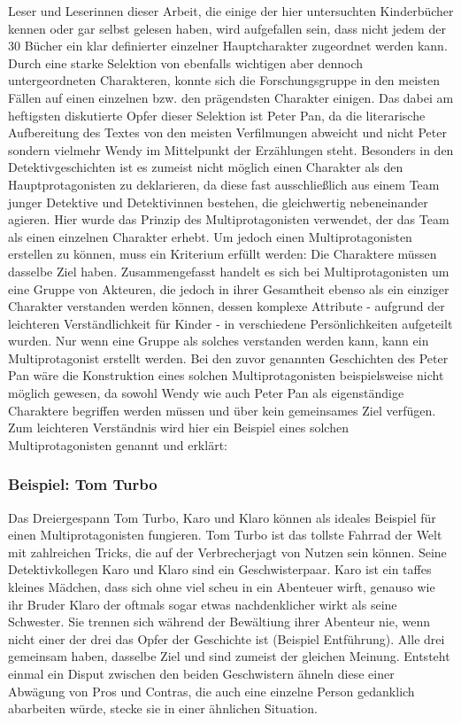 Leser und Leserinnen dieser Arbeit, die einige der hier untersuchten
Kinderbücher kennen oder gar selbst gelesen haben, wird aufgefallen
sein, dass nicht jedem der 30 Bücher ein klar definierter einzelner
Hauptcharakter zugeordnet werden kann. Durch eine starke Selektion von
ebenfalls wichtigen aber dennoch untergeordneten Charakteren, konnte
sich die Forschungsgruppe in den meisten Fällen auf einen einzelnen bzw.
den prägendsten Charakter einigen. Das dabei am heftigsten diskutierte
Opfer dieser Selektion ist Peter Pan, da die literarische Aufbereitung
des Textes von den meisten Verfilmungen abweicht und nicht Peter sondern
vielmehr Wendy im Mittelpunkt der Erzählungen steht. Besonders in den
Detektivgeschichten ist es zumeist nicht möglich einen Charakter als den
Hauptprotagonisten zu deklarieren, da diese fast ausschließlich aus
einem Team junger Detektive und Detektivinnen bestehen, die gleichwertig
nebeneinander agieren. Hier wurde das Prinzip des Multiprotagonisten
verwendet, der das Team als einen einzelnen Charakter erhebt. Um jedoch
einen Multiprotagonisten erstellen zu können, muss ein Kriterium erfüllt
werden: Die Charaktere müssen dasselbe Ziel haben. Zusammengefasst
handelt es sich bei Multiprotagonisten um eine Gruppe von Akteuren, die
jedoch in ihrer Gesamtheit ebenso als ein einziger Charakter verstanden
werden können, dessen komplexe Attribute - aufgrund der leichteren
Verständlichkeit für Kinder - in verschiedene Persönlichkeiten
aufgeteilt wurden. Nur wenn eine Gruppe als solches verstanden werden
kann, kann ein Multiprotagonist erstellt werden. Bei den zuvor genannten
Geschichten des Peter Pan wäre die Konstruktion eines solchen
Multiprotagonisten beispielsweise nicht möglich gewesen, da sowohl Wendy
wie auch Peter Pan als eigenständige Charaktere begriffen werden müssen
und über kein gemeinsames Ziel verfügen. Zum leichteren Verständnis wird
hier ein Beispiel eines solchen Multiprotagonisten genannt und erklärt:

\subsubsection{Beispiel: Tom Turbo}

Das Dreiergespann Tom Turbo, Karo und Klaro können als ideales Beispiel
für einen Multiprotagonisten fungieren. Tom Turbo ist das tollste
Fahrrad der Welt mit zahlreichen Tricks, die auf der Verbrecherjagt von
Nutzen sein können. Seine Detektivkollegen Karo und Klaro sind ein
Geschwisterpaar. Karo ist ein taffes kleines Mädchen, dass sich ohne
viel scheu in ein Abenteuer wirft, genauso wie ihr Bruder Klaro der
oftmals sogar etwas nachdenklicher wirkt als seine Schwester. Sie
trennen sich während der Bewältiung ihrer Abenteur nie, wenn nicht einer
der drei das Opfer der Geschichte ist (Beispiel Entführung). Alle drei
gemeinsam haben, dasselbe Ziel und sind zumeist der gleichen Meinung.
Entsteht einmal ein Disput zwischen den beiden Geschwistern ähneln diese
einer Abwägung von Pros und Contras, die auch eine einzelne Person
gedanklich abarbeiten würde, stecke sie in einer ähnlichen Situation.
\parencite{Leope2008}

